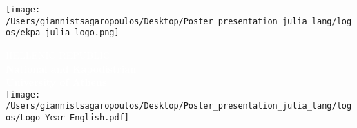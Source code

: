 \documentclass[border=10pt]{standalone}
\begin{document}
 \pagecolor{uoftblue}

			\begin{minipage}{0.2\textwidth}
				\texttt{[image: /Users/giannistsagaropoulos/Desktop/Poster\_presentation\_julia\_lang/logos/ekpa\_julia\_logo.png]}
			\end{minipage}
			\begin{minipage}{0.50\textwidth}
				\centering
				\large{\textcolor{white}{HELLENIC REPUBLIC}}\\
				\Large{\textbf{\textcolor{white}{National and Kapodistrian}\\\textcolor{white}{University of Athens}}}\\[2mm]
				\texttt{[image: /Users/giannistsagaropoulos/Desktop/Poster\_presentation\_julia\_lang/logos/Logo\_Year\_English.pdf]}
			\end{minipage}

	
\end{document}

